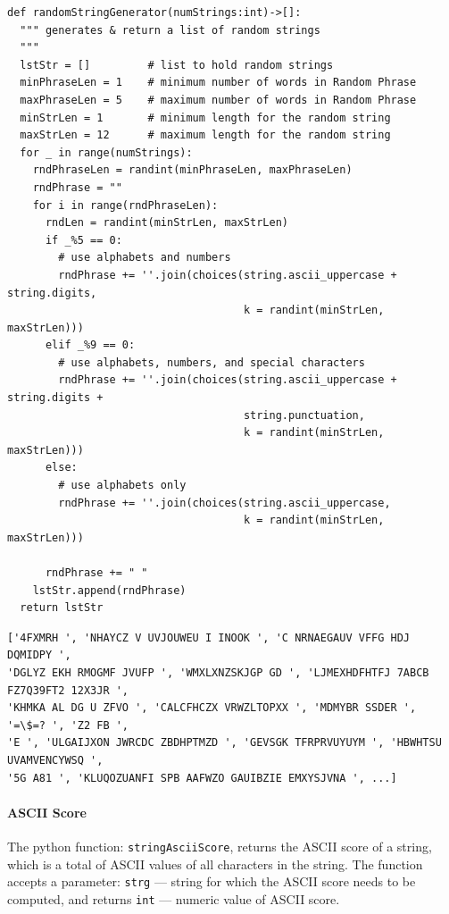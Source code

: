\documentclass[UTF8, letter]{article}
\begin{document}
\begin{codeblock}
\begin{verbatim}
def randomStringGenerator(numStrings:int)->[]:
  """ generates & return a list of random strings
  """
  lstStr = []         # list to hold random strings
  minPhraseLen = 1    # minimum number of words in Random Phrase
  maxPhraseLen = 5    # maximum number of words in Random Phrase
  minStrLen = 1       # minimum length for the random string
  maxStrLen = 12      # maximum length for the random string
  for _ in range(numStrings):
    rndPhraseLen = randint(minPhraseLen, maxPhraseLen)
    rndPhrase = ""
    for i in range(rndPhraseLen):
      rndLen = randint(minStrLen, maxStrLen)
      if _%5 == 0:
        # use alphabets and numbers
        rndPhrase += ''.join(choices(string.ascii_uppercase + string.digits,
                                     k = randint(minStrLen, maxStrLen)))
      elif _%9 == 0:
        # use alphabets, numbers, and special characters
        rndPhrase += ''.join(choices(string.ascii_uppercase + string.digits + 
                                     string.punctuation, 
                                     k = randint(minStrLen, maxStrLen)))
      else:
        # use alphabets only
        rndPhrase += ''.join(choices(string.ascii_uppercase,
                                     k = randint(minStrLen, maxStrLen)))
        
      rndPhrase += " "
    lstStr.append(rndPhrase)
  return lstStr	
\end{verbatim}
\end{codeblock}

\vspace{5mm}
\begin{codeblock}[frametitle=Output --- List of Random Phrases:]
\begin{verbatim}
['4FXMRH ', 'NHAYCZ V UVJOUWEU I INOOK ', 'C NRNAEGAUV VFFG HDJ DQMIDPY ', 
'DGLYZ EKH RMOGMF JVUFP ', 'WMXLXNZSKJGP GD ', 'LJMEXHDFHTFJ 7ABCB FZ7Q39FT2 12X3JR ', 
'KHMKA AL DG U ZFVO ', 'CALCFHCZX VRWZLTOPXX ', 'MDMYBR SSDER ', '=\$=? ', 'Z2 FB ', 
'E ', 'ULGAIJXON JWRCDC ZBDHPTMZD ', 'GEVSGK TFRPRVUYUYM ', 'HBWHTSU UVAMVENCYWSQ ', 
'5G A81 ', 'KLUQOZUANFI SPB AAFWZO GAUIBZIE EMXYSJVNA ', ...]	
\end{verbatim}
\end{codeblock}

\pagebreak
\paragraph{ASCII Score}
The python function: \texttt{stringAsciiScore}, returns the ASCII score of a string, which is a total of ASCII values of all characters in the string. The function accepts a parameter: \texttt{strg} --- string for which the ASCII score needs to be computed, and returns \texttt{int} --- numeric value of ASCII score.
\end{document}
